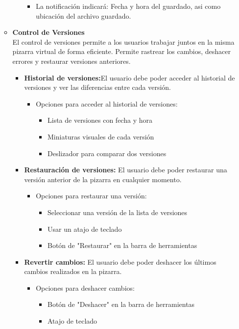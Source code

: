 \documentclass[a4paper, oneside, final]{scrartcl}
\begin{document}
\begin{enumerate}
\begin{itemize}
\begin{itemize}
\begin{itemize}
      \item La notificación indicará: Fecha y hora del guardado, asi como ubicación del archivo guardado.
      \end{itemize}
    \end{itemize}
  \item \textbf{Control de Versiones}\\
    El control de versiones permite a los usuarios trabajar juntos en la misma pizarra virtual de forma eficiente. Permite rastrear los cambios, deshacer errores y restaurar versiones anteriores.
    \begin{itemize}
    \item \textbf{Historial de versiones:}El usuario debe poder acceder al historial de versiones y ver las diferencias entre cada versión.
      \begin{itemize}
      \item Opciones para acceder al historial de versiones:
        \begin{itemize}
        \item Lista de versiones con fecha y hora
        \item Miniaturas visuales de cada versión
        \item Deslizador para comparar dos versiones
        \end{itemize}
      \end{itemize}
    \item \textbf{Restauración de versiones:} El usuario debe poder restaurar una versión anterior de la pizarra en cualquier momento.
      \begin{itemize}
      \item Opciones para restaurar una versión:
        \begin{itemize}
        \item Seleccionar una versión de la lista de versiones
        \item Usar un atajo de teclado
        \item Botón de "Restaurar" en la barra de herramientas
        \end{itemize}
      \end{itemize}
    \item \textbf{Revertir cambios:} El usuario debe poder deshacer los últimos cambios realizados en la pizarra.
      \begin{itemize}
      \item Opciones para deshacer cambios:
        \begin{itemize}
        \item Botón de "Deshacer" en la barra de herramientas
        \item Atajo de teclado
        \end{itemize}
      \end{itemize}
    \end{itemize}
  \end{itemize}


\end{enumerate}
\end{document}
